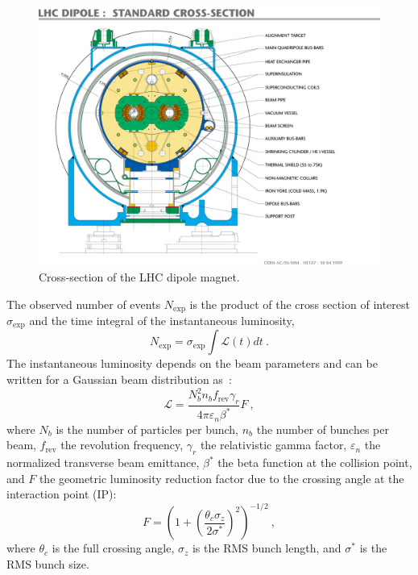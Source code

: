 \begin{figure}\centering
\includegraphics[width=.9\textwidth,clip=true,viewport=0 20 680 550]{figs/cms/lhc-pho-1999-172.jpg}
\caption{Cross-section of the LHC dipole magnet.\label{fig:LHCDipole}}
\end{figure}

The observed number of events $N_{\mathrm{exp}}$ is the product of the cross
section of interest $\sigma_{\mathrm{exp}}$ and the time integral of
the instantaneous luminosity,
\begin{equation}
N_{\mathrm{exp}}  =\sigma_{\mathrm{exp}}\int \mathscr{L}(t)dt ~.
\end{equation}
The instantaneous luminosity depends on the beam parameters and
can be written for a Gaussian beam distribution as~\cite{LHCMachine}:
\begin{equation}
\mathscr{L} =
\frac{N_b^2n_bf_{\mathrm{rev}}\gamma_r}{4\pi\varepsilon_n\beta^{\ast}}F~,
\label{eqn:instlumi}
\end{equation}
where $N_b$ is the number of particles per bunch, $n_b$ the number
of bunches per beam, $f_{\mathrm{rev}}$ the revolution frequency,
$\gamma_r$ the relativistic gamma factor, $\varepsilon_n$ the
normalized transverse beam emittance, $\beta^{\ast}$ the beta function
at the collision point, and $F$ the geometric luminosity reduction
factor due to the crossing angle at the interaction point (IP):
\begin{equation}
F=\left(1+\left(\frac{\theta_c\sigma_z}{2\sigma^{\ast}}\right)^2\right)^{-1/2}~,
\label{eqn:F}
\end{equation}
where $\theta_c$ is the full crossing angle, $\sigma_z$ is the RMS
bunch length, and $\sigma^{\ast}$ is the RMS bunch size.

